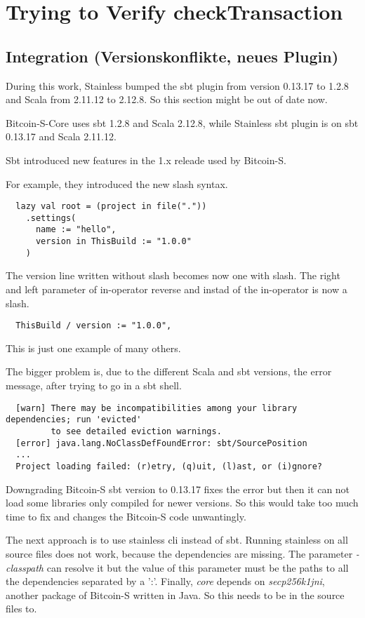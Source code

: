 \chapter{Trying to Verify checkTransaction}
\label{chap:connecting}

\section{Integration (Versionskonflikte, neues Plugin)}
During this work, Stainless bumped the sbt plugin from version 0.13.17 to 1.2.8 and Scala from 2.11.12 to 2.12.8.
So this section might be out of date now.

Bitcoin-S-Core uses sbt 1.2.8 and Scala 2.12.8, while Stainless sbt plugin is on sbt 0.13.17 and Scala 2.11.12.

Sbt introduced new features in the 1.x releade used by Bitcoin-S.

For example, they introduced the new slash syntax.
\begin{lstlisting}
  lazy val root = (project in file("."))
    .settings(
      name := "hello",
      version in ThisBuild := "1.0.0"
    )
\end{lstlisting}
The version line written without slash becomes now one with slash.
The right and left parameter of in-operator reverse and instad of the in-operator is now a slash.
\begin{lstlisting}
  ThisBuild / version := "1.0.0",
\end{lstlisting}
This is just one example of many others.

The bigger problem is, due to the different Scala and sbt versions, the error message, after trying to go in a sbt shell.
\begin{lstlisting}
  [warn] There may be incompatibilities among your library dependencies; run 'evicted'
         to see detailed eviction warnings.
  [error] java.lang.NoClassDefFoundError: sbt/SourcePosition
  ...
  Project loading failed: (r)etry, (q)uit, (l)ast, or (i)gnore?
\end{lstlisting}
Downgrading Bitcoin-S sbt version to 0.13.17 fixes the error but then it can not load some libraries only compiled for newer versions.
So this would take too much time to fix and changes the Bitcoin-S code unwantingly.

The next approach is to use stainless cli instead of sbt.
Running stainless on all source files does not work, because the dependencies are missing.
The parameter \emph{-classpath} can resolve it but the value of this parameter must be the paths to all the dependencies separated by a ':'.
Finally, \emph{core} depends on \emph{secp256k1jni}, another package of Bitcoin-S written in Java.
So this needs to be in the source files to.

